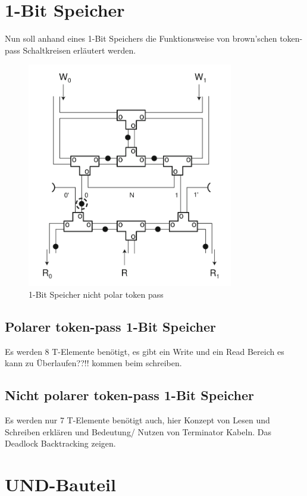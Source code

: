 \section{1-Bit Speicher}
Nun soll anhand eines 1-Bit Speichers die Funktionsweise von brown'schen 
token-pass Schaltkreisen erläutert werden. 

\begin{figure}[h]
      \centering
      \includegraphics[width=9cm]{bilder/NonPolarMemory.png} 
      \caption{1-Bit Speicher nicht polar token pass}
\end{figure}

\subsection{Polarer token-pass 1-Bit Speicher}
Es werden 8 T-Elemente benötigt, es gibt ein Write und ein Read Bereich
es kann zu
Überlaufen??!!
kommen beim schreiben.  

\subsection{Nicht polarer token-pass 1-Bit Speicher}
Es werden nur 7 T-Elemente benötigt auch, hier Konzept von Lesen und Schreiben
erklären und Bedeutung/ Nutzen von Terminator Kabeln.
Das Deadlock Backtracking zeigen.

\section{UND-Bauteil}

